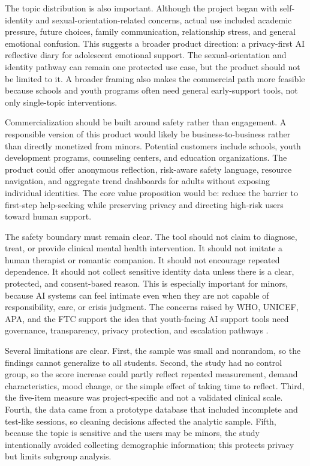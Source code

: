 The topic distribution is also important. Although the project began with self-identity and sexual-orientation-related concerns, actual use included academic pressure, future choices, family communication, relationship stress, and general emotional confusion. This suggests a broader product direction: a privacy-first AI reflective diary for adolescent emotional support. The sexual-orientation and identity pathway can remain one protected use case, but the product should not be limited to it. A broader framing also makes the commercial path more feasible because schools and youth programs often need general early-support tools, not only single-topic interventions.

Commercialization should be built around safety rather than engagement. A responsible version of this product would likely be business-to-business rather than directly monetized from minors. Potential customers include schools, youth development programs, counseling centers, and education organizations. The product could offer anonymous reflection, risk-aware safety language, resource navigation, and aggregate trend dashboards for adults without exposing individual identities. The core value proposition would be: reduce the barrier to first-step help-seeking while preserving privacy and directing high-risk users toward human support.

The safety boundary must remain clear. The tool should not claim to diagnose, treat, or provide clinical mental health intervention. It should not imitate a human therapist or romantic companion. It should not encourage repeated dependence. It should not collect sensitive identity data unless there is a clear, protected, and consent-based reason. This is especially important for minors, because AI systems can feel intimate even when they are not capable of responsibility, care, or crisis judgment. The concerns raised by WHO, UNICEF, APA, and the FTC support the idea that youth-facing AI support tools need governance, transparency, privacy protection, and escalation pathways \parencite{apa_ai2025, ftc2025, unicef2025, who2024}.

Several limitations are clear. First, the sample was small and nonrandom, so the findings cannot generalize to all students. Second, the study had no control group, so the score increase could partly reflect repeated measurement, demand characteristics, mood change, or the simple effect of taking time to reflect. Third, the five-item measure was project-specific and not a validated clinical scale. Fourth, the data came from a prototype database that included incomplete and test-like sessions, so cleaning decisions affected the analytic sample. Fifth, because the topic is sensitive and the users may be minors, the study intentionally avoided collecting demographic information; this protects privacy but limits subgroup analysis.

